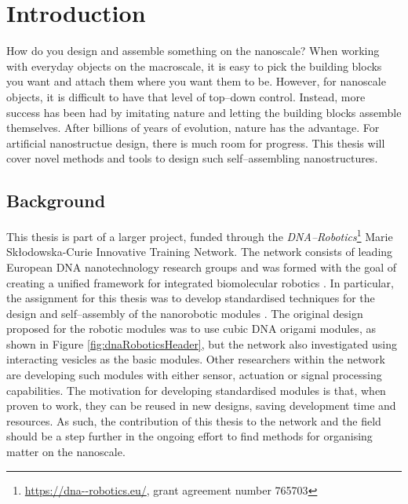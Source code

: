 
\chapter{Introduction}\label{ch:1-intro}

\minitoc

How do you design and assemble something on the nanoscale? When working with everyday objects on the macroscale, it is easy to pick the building blocks you want and attach them where you want them to be. However, for nanoscale objects, it is difficult to have that level of top--down control. Instead, more success has been had by imitating nature and letting the building blocks assemble themselves. After billions of years of evolution, nature has the advantage. For artificial nanostructue design, there is much room for progress. This thesis will cover novel methods and tools to design such self--assembling nanostructures.

\section{Background}
This thesis is part of a larger project, funded through the \emph{DNA--Robotics}\footnote{\url{https://dna--robotics.eu/}, grant agreement number 765703} Marie Skłodowska-Curie Innovative Training Network. The network consists of leading European DNA nanotechnology research groups and was formed with the goal of creating a unified framework for integrated biomolecular robotics \cite{dnaroboticsResearch}. In particular, the assignment for this thesis was to develop standardised techniques for the design and self--assembly of the nanorobotic modules \cite{dnaroboticsESR12}. The original design proposed for the robotic modules was to use cubic DNA origami modules, as shown in Figure \ref{fig:dnaRoboticsHeader}, but the network also investigated using interacting vesicles as the basic modules. Other researchers within the network are developing such modules with either sensor, actuation or signal processing capabilities. The motivation for developing standardised modules is that, when proven to work, they can be reused in new designs, saving development time and resources.
As such, the contribution of this thesis to the network and the field should be a step further in the ongoing effort to find methods for organising matter on the nanoscale.

